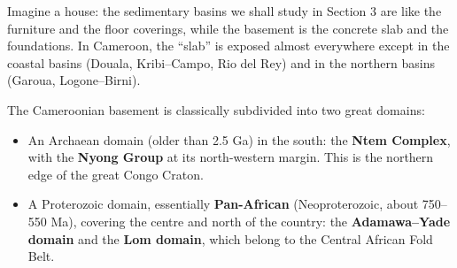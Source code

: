\documentclass[11pt]{article}
\newcommand{\cle}[1]{{\popxbold\color{popdark}#1}}
\begin{document}
Imagine a house: the sedimentary basins we shall study in Section 3 are like the furniture and the floor coverings, while the basement is the concrete slab and the foundations. In Cameroon, the ``slab'' is exposed almost everywhere except in the coastal basins (Douala, Kribi--Campo, Rio del Rey) and in the northern basins (Garoua, Logone--Birni).

The Cameroonian basement is classically subdivided into two great domains:

\begin{itemize}
\item An \cle{Archaean} domain (older than 2.5 Ga) in the south: the \textbf{Ntem Complex}, with the \textbf{Nyong Group} at its north-western margin. This is the northern edge of the great \cle{Congo Craton}.
\item A \cle{Proterozoic} domain, essentially \textbf{Pan-African} (Neoproterozoic, about 750--550 Ma), covering the centre and north of the country: the \textbf{Adamawa--Yade domain} and the \textbf{Lom domain}, which belong to the \cle{Central African Fold Belt}.
\end{itemize}
\end{document}
